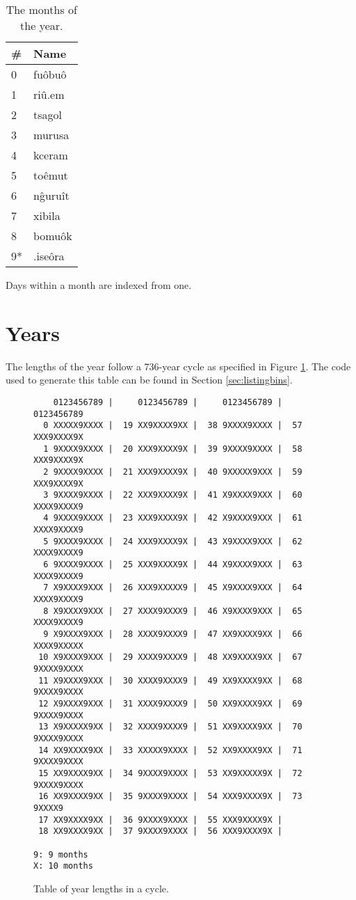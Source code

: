 \documentclass{book}
\begin{document}
\begin{table}[ht]
    \caption{The months of the year.}
    \centering
    \begin{tabular}{|l|>{\kardinal}l|}
        \hline
        \# & \textnormal{Name} \\
        \hline
        0 & fu\^obu\^o \\
        1 & ri\^u.em \\
        2 & tsagol \\
        3 & murusa \\
        4 & kceram \\
        5 & to\^emut \\
        6 & n\^guru\^it \\
        7 & xibila \\
        8 & bomu\^ok \\
        \hline
        9* & .ise\^ora \\
        \hline
    \end{tabular}
\end{table}

Days within a month are indexed from one.

\section{Years}

The lengths of the year follow a 736-year cycle as specified in Figure \ref{fig:years}.
The code used to generate this table can be found in Section \ref{sec:listingbins}.

\begin{figure}[ht]
    \caption{Table of year lengths in a cycle. \label{fig:years}}
    \centering
    \begin{verbatim}
    0123456789 |     0123456789 |     0123456789 |     0123456789
  0 XXXXX9XXXX |  19 XX9XXXX9XX |  38 9XXXX9XXXX |  57 XXX9XXXX9X
  1 9XXXX9XXXX |  20 XXX9XXXX9X |  39 9XXXX9XXXX |  58 XXX9XXXX9X
  2 9XXXX9XXXX |  21 XXX9XXXX9X |  40 9XXXXX9XXX |  59 XXX9XXXX9X
  3 9XXXX9XXXX |  22 XXX9XXXX9X |  41 X9XXXX9XXX |  60 XXXX9XXXX9
  4 9XXXX9XXXX |  23 XXX9XXXX9X |  42 X9XXXX9XXX |  61 XXXX9XXXX9
  5 9XXXX9XXXX |  24 XXX9XXXX9X |  43 X9XXXX9XXX |  62 XXXX9XXXX9
  6 9XXXX9XXXX |  25 XXX9XXXX9X |  44 X9XXXX9XXX |  63 XXXX9XXXX9
  7 X9XXXX9XXX |  26 XXX9XXXXX9 |  45 X9XXXX9XXX |  64 XXXX9XXXX9
  8 X9XXXX9XXX |  27 XXXX9XXXX9 |  46 X9XXXX9XXX |  65 XXXX9XXXX9
  9 X9XXXX9XXX |  28 XXXX9XXXX9 |  47 XX9XXXX9XX |  66 XXXX9XXXXX
 10 X9XXXX9XXX |  29 XXXX9XXXX9 |  48 XX9XXXX9XX |  67 9XXXX9XXXX
 11 X9XXXX9XXX |  30 XXXX9XXXX9 |  49 XX9XXXX9XX |  68 9XXXX9XXXX
 12 X9XXXX9XXX |  31 XXXX9XXXX9 |  50 XX9XXXX9XX |  69 9XXXX9XXXX
 13 X9XXXXX9XX |  32 XXXX9XXXX9 |  51 XX9XXXX9XX |  70 9XXXX9XXXX
 14 XX9XXXX9XX |  33 XXXXX9XXXX |  52 XX9XXXX9XX |  71 9XXXX9XXXX
 15 XX9XXXX9XX |  34 9XXXX9XXXX |  53 XX9XXXXX9X |  72 9XXXX9XXXX
 16 XX9XXXX9XX |  35 9XXXX9XXXX |  54 XXX9XXXX9X |  73 9XXXX9    
 17 XX9XXXX9XX |  36 9XXXX9XXXX |  55 XXX9XXXX9X | 
 18 XX9XXXX9XX |  37 9XXXX9XXXX |  56 XXX9XXXX9X | 

9: 9 months
X: 10 months
    \end{verbatim}
\end{figure}
\end{document}
